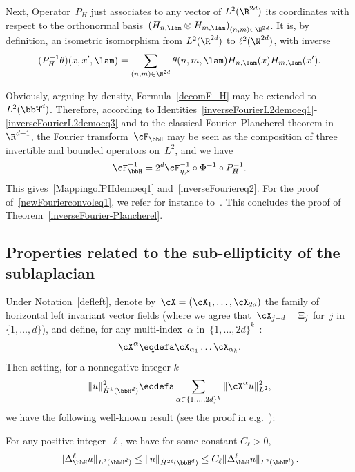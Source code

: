 Next, Operator~$P_H$ just associates to any vector of $L^2(\R^{2d})$ its coordinates with respect to the orthonormal basis~$\left(H_{n,\lam}\otimes H_{m,\lam} \right)_{(n,m)\in \N^{2d}}$. It is, by definition, an isometric isomorphism from $L^2(\R^{2d})$ to $\ell^2(\N^{2d})$, with inverse
\begin{equation}\label{inverseFourierL2demoeq3}
(P_H^{-1} \theta)(x,x',\lam) = \sum_{(n,m)\in \N^{2d}} \theta(n,m,\lam) H_{n,\lam} (x) H_{m,\lam}(x').
\end{equation}

Obviously, arguing by density, Formula~\eqref{decomF_H} may be extended to $L^2(\bbH^d)$. Therefore, according to Identities~\eqref{inverseFourierL2demoeq1}-\eqref{inverseFourierL2demoeq3} and to the classical Fourier--Plancherel theorem in~$\R^{d+1}$, the Fourier transform~$\cF_\bbH$ may be seen as the composition of three invertible and bounded operators on~$L^2$, and we have
\[
\cF_\bbH^{-1} = 2^d \cF_{\eta,s}^{-1} \circ \Phi^{-1} \circ P_H^{-1}.
\]
This gives~\eqref{MappingofPHdemoeq1} and~\eqref{inverseFouriereq2}. For the proof of~\eqref{newFourierconvoleq1}, we refer for instance to~\cite{bcdFHspace}. This concludes the proof of Theorem~\ref{inverseFourier-Plancherel}.

\subsection{Properties related to the sub-ellipticity of the sublaplacian} \label{subellipticity}

Under Notation~\eqref{defleft}, denote by~${\cX}=(\cX_1,\dots,\cX_{2d})$ the family of horizontal left invariant vector fields (where we agree that~$\cX_{j+d}=\Xi_j$ for~$j$ in~$ \{1,\dots, d\}$), and define, for any multi-index~$\alpha$ in~$ \{1,\dots, 2d\}^k$~:
\begin{equation}\label{prodreal}
\mathcal{\cX}^{\alpha} \eqdefa \cX_{\alpha_1}\dots
\cX_{\alpha_k}.
\end{equation}
Then setting, for a nonnegative integer $k$
\[
\|u\|_{\dot H^k(\bbH^d)}^2 \eqdefa \sum_{\alpha\in \{1,\dots,2d\}^k} \|\cX^\alpha u\|_{L^2}^2,
\]
we have the following well-known result (see the proof in e.g.~\cite{CCX,H}):

\begin{theo}\label{maximalestimatepaire}
For any positive integer~$\ell$, we have for some constant $C_\ell>0$,
\[
\|\Delta_{\bbH} ^\ell u\|_{L^2(\bbH^d)}\leq \|u\|_{\dot H^{2\ell}(\bbH^d)}
\leq C_\ell\|\Delta_{\bbH} ^\ell u\|_{L^2(\bbH^d)}\,.
\]
\end{theo}

